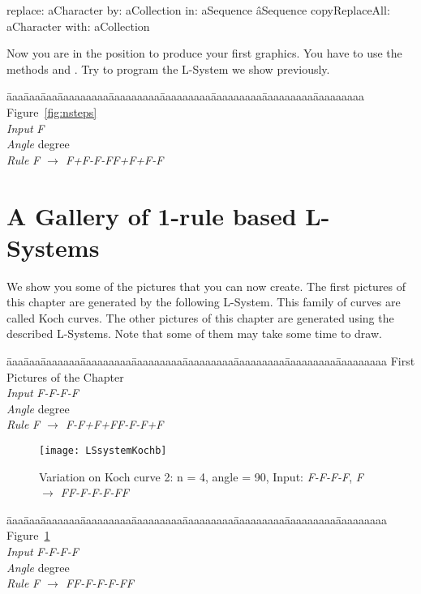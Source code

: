 \begin{method}
replace: aCharacter by: aCollection in: aSequence 
   \^ aSequence copyReplaceAll: aCharacter with: aCollection
\end{method}

Now you are in the position to produce your first graphics. You have
to use the methods  and
. Try to program the L-System we show previously. 

\begin{tabbing}
\=aaa\=aaa\=aaa\=aaaaaaaaa\=aaaaaaaaa\=aaaaaaaaa\=aaaaaaaaa\=aaaaaaaaa\=aaaaaaaaa\kill
Figure~\ref{fig:nsteps}\\
\>\>\>\> \emph{Input} \>\>\emph{F}\\
\>\>\>\> \emph{Angle} \> degree\\
\>\>\>\> \emph{Rule}  \>\>\emph{F $\rightarrow$ F+F-F-FF+F+F-F}
\end{tabbing}



\section{A Gallery of 1-rule based L-Systems}
We show you some of the pictures that you can now create. The first pictures of this chapter are generated by the following L-System. This family of curves are called Koch curves. The other pictures of this chapter are generated using the described L-Systems. Note that some of them may take some time to draw.

\begin{tabbing}
\=aaa\=aaa\=aaaaaaa\=aaaaaaaaa\=aaaaaaaaa\=aaaaaaaaa\=aaaaaaaaa\=aaaaaaaaa\=aaaaaaaaa\kill
First Pictures of the Chapter \\
\>\> \emph{Input} \>\>\emph{F-F-F-F}\\
\>\> \emph{Angle} \> degree\\
\>\> \emph{Rule}  \>\>\emph{F $\rightarrow$ F-F+F+FF-F-F+F}
\end{tabbing}

\begin{figure}[!h]
\centerline{\texttt{[image: LSsystemKochb]}}
\caption{Variation on Koch curve 2: n = 4, angle = 90, Input: \emph{F-F-F-F}, \emph{F $\rightarrow$ FF-F-F-F-FF}}
\label{fig:Kochb}
\end{figure}

\begin{tabbing}
\=aaa\=aaa\=aaaaaaa\=aaaaaaaaa\=aaaaaaaaa\=aaaaaaaaa\=aaaaaaaaa\=aaaaaaaaa\=aaaaaaaaa\kill
Figure~\ref{fig:Kochb} \\
\>\> \emph{Input} \>\>\emph{F-F-F-F}\\
\>\> \emph{Angle} \> degree\\
\>\> \emph{Rule}  \>\>\emph{F $\rightarrow$ FF-F-F-F-FF}
\end{tabbing}


